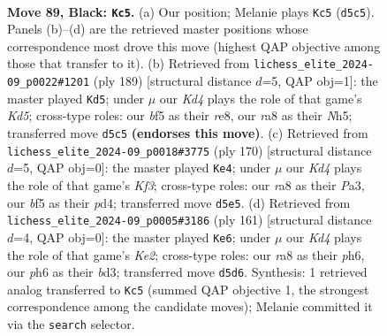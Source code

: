 \documentclass[11pt]{article}
\begin{document}
\begin{figure}[p]\centering
\begin{subfigure}{0.46\textwidth}\centering
\resizebox{\linewidth}{!}{%
\newchessgame
\chessboard[
  setfen={R7/5P2/7P/3k1B2/8/8/8/7K b - - 0 89},
  showmover=false,
  pgfstyle=straightmove, color=movearrow, markmove={d5-c5}
]}
\caption{}
\end{subfigure}\hfill
\begin{subfigure}{0.46\textwidth}\centering
\resizebox{\linewidth}{!}{%
\newchessgame
\chessboard[
  setfen={4R3/8/8/K4P1n/3k4/8/8/8 b - - 0 95},
  showmover=false,
  pgfstyle=straightmove, color=movearrow, markmove={d4-d5}
]}
\caption{}
\end{subfigure}
\\[4pt]
\begin{subfigure}{0.46\textwidth}\centering
\resizebox{\linewidth}{!}{%
\newchessgame
\chessboard[
  setfen={8/p7/8/6k1/3p4/P4K2/8/8 w - - 0 86},
  showmover=false,
  pgfstyle=straightmove, color=movearrow, markmove={f3-e4}
]}
\caption{}
\end{subfigure}\hfill
\begin{subfigure}{0.46\textwidth}\centering
\resizebox{\linewidth}{!}{%
\newchessgame
\chessboard[
  setfen={8/4k3/2K4P/8/6p1/3B2B1/8/8 b - - 0 81},
  showmover=false,
  pgfstyle=straightmove, color=movearrow, markmove={e7-e6}
]}
\caption{}
\end{subfigure}
\caption{\textbf{Move 89, Black: \texttt{Kc5}.} (a) Our position; Melanie plays \texttt{Kc5} (\texttt{d5c5}). Panels (b)--(d) are the retrieved master positions whose correspondence most drove this move (highest QAP objective among those that transfer to it). (b) Retrieved from \texttt{lichess\_elite\_2024-09\_p0022\#1201} (ply 189) [structural distance $d$=5, QAP obj=1]: the master played \texttt{Kd5}; under $\mu$ our \emph{Kd4} plays the role of that game's \emph{Kd5}; cross-type roles: our \emph{b}f5 as their \emph{r}e8, our \emph{r}a8 as their \emph{N}h5; transferred move \texttt{d5c5} \textbf{(endorses this move)}. (c) Retrieved from \texttt{lichess\_elite\_2024-09\_p0018\#3775} (ply 170) [structural distance $d$=5, QAP obj=0]: the master played \texttt{Ke4}; under $\mu$ our \emph{Kd4} plays the role of that game's \emph{Kf3}; cross-type roles: our \emph{r}a8 as their \emph{P}a3, our \emph{b}f5 as their \emph{p}d4; transferred move \texttt{d5e5}. (d) Retrieved from \texttt{lichess\_elite\_2024-09\_p0005\#3186} (ply 161) [structural distance $d$=4, QAP obj=0]: the master played \texttt{Ke6}; under $\mu$ our \emph{Kd4} plays the role of that game's \emph{Ke2}; cross-type roles: our \emph{r}a8 as their \emph{p}h6, our \emph{p}h6 as their \emph{b}d3; transferred move \texttt{d5d6}. Synthesis: 1 retrieved analog transferred to \texttt{Kc5} (summed QAP objective 1, the strongest correspondence among the candidate moves); Melanie committed it via the \texttt{search} selector.}
\label{fig:thought-m177}
\end{figure}
\end{document}
